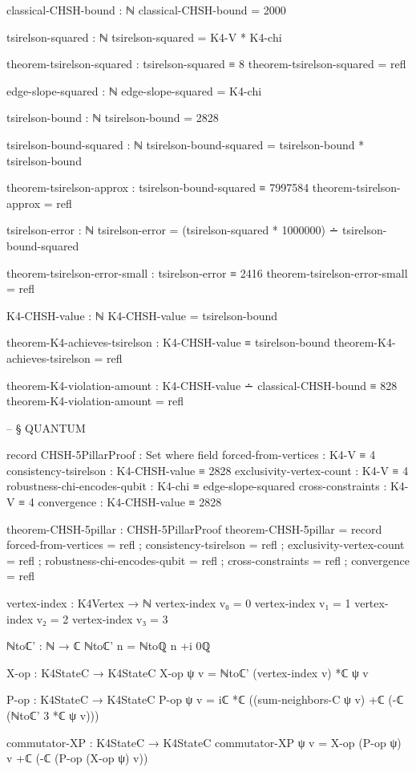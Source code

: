 \documentclass[11pt,a4paper]{book}
\begin{document}
\begin{code}
classical-CHSH-bound : ℕ
classical-CHSH-bound = 2000

tsirelson-squared : ℕ
tsirelson-squared = K4-V * K4-chi

theorem-tsirelson-squared : tsirelson-squared ≡ 8
theorem-tsirelson-squared = refl

edge-slope-squared : ℕ
edge-slope-squared = K4-chi

tsirelson-bound : ℕ
tsirelson-bound = 2828

tsirelson-bound-squared : ℕ
tsirelson-bound-squared = tsirelson-bound * tsirelson-bound

theorem-tsirelson-approx : tsirelson-bound-squared ≡ 7997584
theorem-tsirelson-approx = refl

tsirelson-error : ℕ
tsirelson-error = (tsirelson-squared * 1000000) ∸ tsirelson-bound-squared

theorem-tsirelson-error-small : tsirelson-error ≡ 2416
theorem-tsirelson-error-small = refl

K4-CHSH-value : ℕ
K4-CHSH-value = tsirelson-bound

theorem-K4-achieves-tsirelson : K4-CHSH-value ≡ tsirelson-bound
theorem-K4-achieves-tsirelson = refl

theorem-K4-violation-amount : K4-CHSH-value ∸ classical-CHSH-bound ≡ 828
theorem-K4-violation-amount = refl


-- § QUANTUM

record CHSH-5PillarProof : Set where
  field
    forced-from-vertices : K4-V ≡ 4
    consistency-tsirelson : K4-CHSH-value ≡ 2828
    exclusivity-vertex-count : K4-V ≡ 4
    robustness-chi-encodes-qubit : K4-chi ≡ edge-slope-squared
    cross-constraints : K4-V ≡ 4
    convergence : K4-CHSH-value ≡ 2828

theorem-CHSH-5pillar : CHSH-5PillarProof
theorem-CHSH-5pillar = record
  { forced-from-vertices = refl
  ; consistency-tsirelson = refl
  ; exclusivity-vertex-count = refl
  ; robustness-chi-encodes-qubit = refl
  ; cross-constraints = refl
  ; convergence = refl
  }

vertex-index : K4Vertex → ℕ
vertex-index v₀ = 0
vertex-index v₁ = 1
vertex-index v₂ = 2
vertex-index v₃ = 3

ℕtoℂ' : ℕ → ℂ
ℕtoℂ' n = ℕtoℚ n +i 0ℚ

X-op : K4StateC → K4StateC
X-op ψ v = ℕtoℂ' (vertex-index v) *ℂ ψ v

P-op : K4StateC → K4StateC
P-op ψ v = iℂ *ℂ ((sum-neighbors-C ψ v) +ℂ (-ℂ (ℕtoℂ' 3 *ℂ ψ v)))

commutator-XP : K4StateC → K4StateC
commutator-XP ψ v = X-op (P-op ψ) v +ℂ (-ℂ (P-op (X-op ψ) v))


\end{code}
\end{document}
